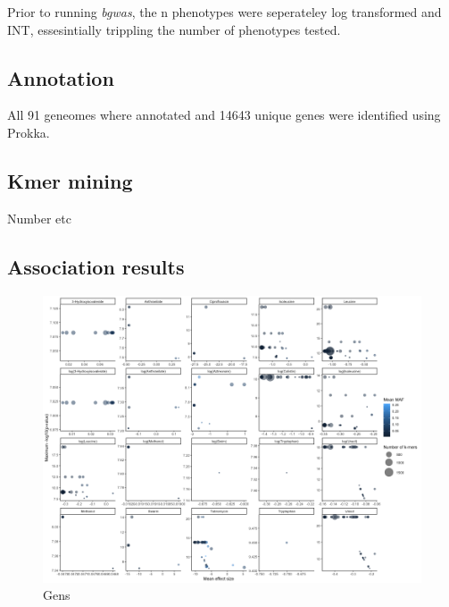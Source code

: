 \documentclass[]{article}
\begin{document}
Prior to running \emph{bgwas}, the n phenotypes were seperateley log
transformed and INT, essesintially trippling the number of phenotypes
tested.

\hypertarget{annotation}{%
\subsection{Annotation}\label{annotation}}

All 91 geneomes where annotated and 14643 unique genes were identified
using Prokka.

\hypertarget{kmer-mining}{%
\subsection{Kmer mining}\label{kmer-mining}}

Number etc

\hypertarget{association-results}{%
\subsection{Association results}\label{association-results}}

\begin{figure}

{\centering \includegraphics[height=0.9\textheight]{_static/genes} 

}

\caption{\label{fig:genes}Gens}\label{fig:unnamed-chunk-8}
\end{figure}
\end{document}
